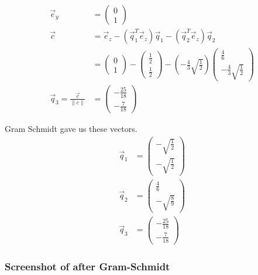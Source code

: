 \documentclass[a4paper]{article}
\begin{document}
\begin{Example}
\begin{PropositionOpt4}
\begin{displaymath}
\begin{align}
\vec{e}_{y} &= \begin{pmatrix}0\\1\end{pmatrix}\\
\vec{c} &= \vec{e}_{z} - (\vec{q}_{1}^{T}\vec{e}_{z})\vec{q}_{1} - (\vec{q}_{2}^{T}\vec{e}_{z})\vec{q}_{2}\\
			&= \begin{pmatrix}0\\1\end{pmatrix} - \begin{pmatrix}\frac12\\\frac12\end{pmatrix}-(-\frac43\sqrt{\frac12})\begin{pmatrix}\frac46\\-\frac43\sqrt{\frac12}\end{pmatrix}\\
\vec{q}_{3} = \frac{\vec{c}}{\|c\|}
			&= \begin{pmatrix}-\frac{25}{18}\\-\frac{7}{18}\end{pmatrix}
\end{align}
\end{displaymath}

Gram Schmidt gave us these vectors.
\begin{displaymath}
\begin{align}
\vec{q}_{1} &=  \begin{pmatrix}-\sqrt{\frac12}\\-\sqrt{\frac12}\end{pmatrix}\\
\vec{q}_{2} &= \begin{pmatrix}\frac46\\-\sqrt{\frac{8}{9}}\end{pmatrix}\\
\vec{q}_{3} &= \begin{pmatrix}-\frac{25}{18}\\-\frac{7}{18}\end{pmatrix}
\end{align}
\end{displaymath}



\subsubsection{Screenshot of after Gram-Schmidt}


\end{PropositionOpt4}
\end{Example}
\end{document}
